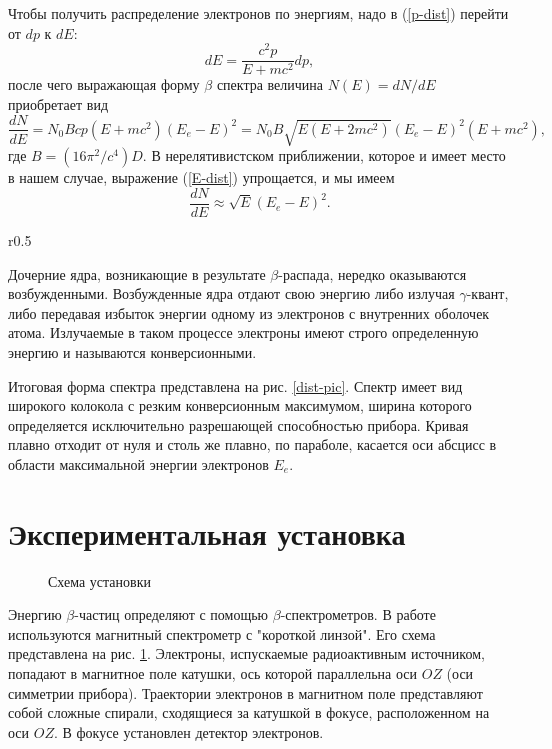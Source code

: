 \documentclass{lab}
\begin{document}
	Чтобы получить распределение электронов по энергиям, надо в (\ref{p-dist}) перейти от $dp$ к $dE$:
	\begin{equation}
	dE = \frac{c^2 p}{E + mc^2} dp,
	\end{equation}
	после чего выражающая форму $\beta$ спектра величина $N(E) = dN/dE$ приобретает вид
	\begin{equation} \label{E-dist}
	\frac{dN}{dE} = N_0 B c p (E + mc^2)(E_e - E)^2 = N_0 B \sqrt{E (E + 2mc^2)} (E_e - E)^2 (E + mc^2), 
	\end{equation}
	где $B = (16 \pi^2 / c^4) D$. В нерелятивистском приближении, которое и имеет место в нашем случае, выражение (\ref{E-dist}) упрощается, и мы имеем
	\begin{equation} \label{non-rel-E-dist}
	\frac{dN}{dE} \approx \sqrt{E} (E_e - E)^2.
	\end{equation}
	
	\begin{wrapfigure}{r}{0.5\linewidth}
		\vspace{-5ex}  
		\caption{Форма спектра $\beta$-частиц}
		\label{dist-pic}
	\end{wrapfigure}
	
	Дочерние ядра, возникающие в результате $\beta$-распада, нередко оказываются возбужденными. Возбужденные ядра отдают свою энергию либо излучая $\gamma$-квант, либо передавая избыток энергии одному из электронов с внутренних оболочек атома. Излучаемые в таком процессе электроны имеют строго определенную энергию и называются конверсионными.
	
	Итоговая форма спектра представлена на рис. \ref{dist-pic}. 
	Спектр имеет вид широкого колокола с резким конверсионным максимумом, ширина которого определяется исключительно разрешающей способностью прибора. Кривая плавно отходит от нуля и столь же плавно, по параболе, касается оси абсцисс в области максимальной энергии электронов $E_e$. 
	
\section*{Экспериментальная установка}

	\begin{figure}[ht!]
		\caption{Схема установки}
		\label{scheme}
	\end{figure}
	
	Энергию $\beta$-частиц определяют с помощью $\beta$-спектрометров. В работе используются магнитный спектрометр с "короткой линзой". Его схема представлена на рис. \ref{scheme}. Электроны, испускаемые радиоактивным источником, попадают в магнитное поле катушки, ось которой параллельна оси $OZ$ (оси симметрии прибора). Траектории электронов в магнитном поле представляют собой сложные спирали, сходящиеся за катушкой в фокусе, расположенном на оси $OZ$. В фокусе установлен детектор электронов.
	
\end{document}

